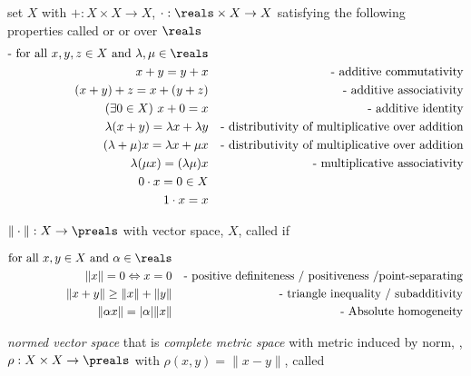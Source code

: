 \documentclass[17pt,landscape]{foils}
\begin{document}
{{

%

\bit
	\item set $X$ with $+:X\times X\to X$, $\cdot: \reals \times X\to X$
		satisfying the following properties
		called  or  or  over $\reals$
		\begin{eqnarray*}
		\mbox{- for all } x,y,z\in X \mbox{ and } \lambda, \mu \in \reals
		\\
			x+y= y+x	&& \mbox{- additive commutativity}
			\\
			(x+y)+z= x+(y+z)	&& \mbox{- additive associativity}
			\\
			(\exists 0\in X)\ x+0=x	&& \mbox{- additive identity}
			\\
			\lambda(x+y) = \lambda x + \lambda y	&& \mbox{- distributivity of multiplicative over addition}
			\\
			(\lambda+\mu)x = \lambda x + \mu x	&& \mbox{- distributivity of multiplicative over addition}
			\\
			\lambda(\mu x)= (\lambda \mu)x	&& \mbox{- multiplicative associativity}
			\\
			0\cdot x = 0\in X&&
			\\
			1\cdot x = x&&
		\end{eqnarray*}
\eit



\bit
	\item $\|\cdot\|:X\to\preals$ with vector space, $X$, called  if

	\vspace{-2em}
	\begin{eqnarray*}
		\mbox{for all } x,y\in X \mbox{ and } \alpha \in \reals&
		\\
		\|x\| = 0 \Leftrightarrow x=0	&& \mbox{- positive definiteness / positiveness /point-separating}
		\\
		\|x+y\|\geq \|x\| + \|y\|	&& \mbox{- triangle inequality / subadditivity}
		\\
		\|\alpha x\| = |\alpha| \|x\|	&& \mbox{- Absolute homogeneity}
	\end{eqnarray*}

	\vspace{-1em}
	\vitem \emph{normed vector space} that is \emph{complete metric space} with metric induced by norm,
		\ie, $\rho:X\times X \to \preals$ with $\rho(x,y)=\|x-y\|$,
		called %

}}
\end{document}
